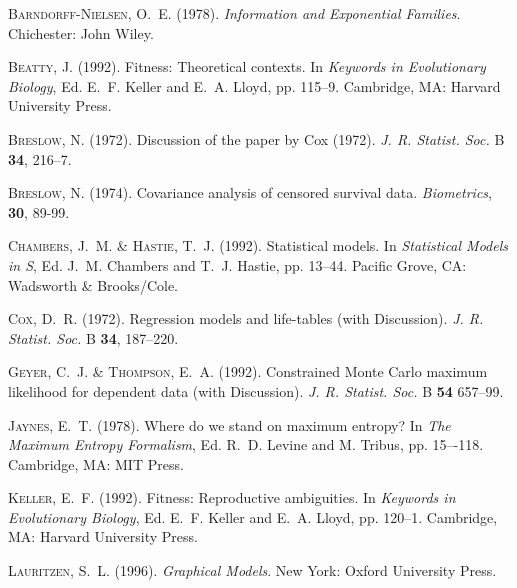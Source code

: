 \begin{thebibliography}{}

\textsc{Barndorff-Nielsen, O.~E.} (1978).
\newblock \emph{Information and Exponential Families}.
\newblock Chichester: John Wiley.

\textsc{Beatty, J.} (1992).
\newblock Fitness: Theoretical contexts.
\newblock In \emph{Keywords in Evolutionary Biology}, Ed. E.~F. Keller
    and E.~A. Lloyd, pp. 115--9.
\newblock Cambridge, MA: Harvard University Press.

\textsc{Breslow, N.} (1972).
\newblock Discussion of the paper by Cox (1972).
\newblock \emph{J. R. Statist. Soc.} B
    \textbf{34}, 216--7.

\textsc{Breslow, N.} (1974).
\newblock Covariance analysis of censored survival data. 
\newblock \emph{Biometrics}, \textbf{30}, 89-99.

\textsc{Chambers, J.~M. \& Hastie, T.~J.} (1992).
\newblock Statistical models.
\newblock In \emph{Statistical Models in S}, Ed. J.~M. Chambers
    and T.~J. Hastie, pp. 13--44.
\newblock Pacific Grove, CA: Wadsworth \& Brooks/Cole.

\textsc{Cox, D.~R.} (1972).
\newblock Regression models and life-tables (with Discussion).
\newblock \emph{J. R. Statist. Soc.} B
    \textbf{34}, 187--220.

\textsc{Geyer, C.~J. \& Thompson, E.~A.} (1992).
\newblock Constrained Monte Carlo maximum likelihood for dependent data
    (with Discussion).
\newblock \emph{J. R. Statist. Soc.} B \textbf{54} 657--99.

\textsc{Jaynes, E.~T.} (1978).
\newblock Where do we stand on maximum entropy?
\newblock In \emph{The Maximum Entropy Formalism}, Ed. R.~D. Levine and
    M. Tribus, pp. 15–-118.
\newblock Cambridge, MA: MIT Press.

\textsc{Keller, E.~F.} (1992).
\newblock Fitness: Reproductive ambiguities.
\newblock In \emph{Keywords in Evolutionary Biology}, Ed. E.~F. Keller
    and E.~A. Lloyd, pp. 120--1.
\newblock Cambridge, MA: Harvard University Press.

\textsc{Lauritzen, S.~L.} (1996).
\newblock \emph{Graphical Models}.
\newblock New York: Oxford University Press.


\end{thebibliography}
